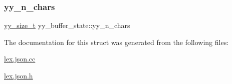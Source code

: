 \subsubsection{\texorpdfstring{yy\+\_\+n\+\_\+chars}{yy\_n\_chars}}
{\footnotesize\ttfamily \hyperlink{lex_8json_8cc_ad557845057f187eec4be07e2717d2afa}{yy\+\_\+size\+\_\+t} yy\+\_\+buffer\+\_\+state\+::yy\+\_\+n\+\_\+chars}



The documentation for this struct was generated from the following files\+:\begin{DoxyCompactItemize}
\item 
\hyperlink{lex_8json_8cc}{lex.\+json.\+cc}\item 
\hyperlink{lex_8json_8h}{lex.\+json.\+h}\end{DoxyCompactItemize}
